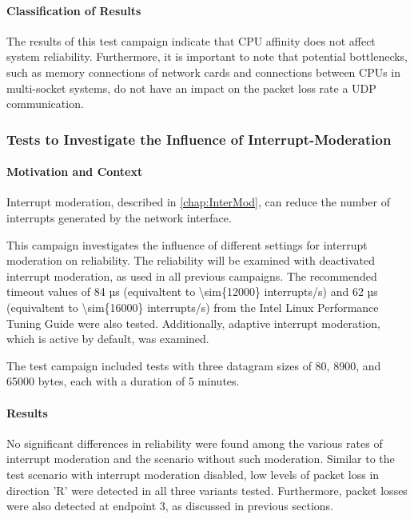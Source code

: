 \paragraph{Classification of Results}
The results of this test campaign indicate that CPU affinity does not affect system reliability. Furthermore, it is important to note that potential bottlenecks, such as memory connections of network cards and connections between CPUs in multi-socket systems, do not have an impact on the packet loss rate a UDP communication.


\subsubsection{Tests to Investigate the Influence of Interrupt-Moderation}
\paragraph{Motivation and Context}

Interrupt moderation, described in \ref{chap:InterMod}, can reduce the number of interrupts generated by the network interface.

This campaign investigates the influence of different settings for interrupt moderation on reliability. The reliability will be examined with deactivated interrupt moderation, as used in all previous campaigns. The recommended timeout values of 84 µs (equivaltent to \num{\sim{12000}} interrupts/s) and 62 µs (equivaltent to \num{\sim{16000}} interrupts/s) from the Intel Linux Performance Tuning Guide \cite{intermod03} were also tested. Additionally, adaptive interrupt moderation, which is active by default, was examined.  

The test campaign included tests with three datagram sizes of 80, 8900, and 65000 bytes, each with a duration of 5 minutes.

\paragraph{Results}
No significant differences in reliability were found among the various rates of interrupt moderation and the scenario without such moderation. Similar to the test scenario with interrupt moderation disabled, low levels of packet loss in direction 'R' were detected in all three variants tested. Furthermore, packet losses were also detected at endpoint 3, as discussed in previous sections.

